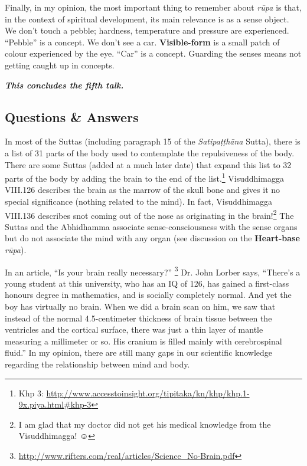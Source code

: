 Finally, in my opinion, the most important thing to remember about \textit{rūpa} is that, in the context of spiritual development, its main relevance is as a sense object. We don’t touch a pebble; hardness, temperature and pressure are experienced. “Pebble” is a concept. We don’t see a car. \textbf{Visible-form} is a small patch of colour experienced by the eye. “Car” is a concept. Guarding the senses means not getting caught up in concepts.

\begin{center}
\textbf{\textit{This concludes the fifth talk.}} \\
\end{center}

\newpage

\subsection*{Questions \& Answers}


In most of the Suttas (including paragraph 15 of the \textit{Satipaṭṭhāna} Sutta), there is a list of 31 parts of the body used to contemplate the repulsiveness of the body. There are some Suttas (added at a much later date) that expand this list to 32 parts of the body by adding the brain to the end of the list.\footnote{Khp 3: \url{http://www.accesstoinsight.org/tipitaka/kn/khp/khp.1-9x.piya.html\#khp-3}} Visuddhimagga VIII.126 describes the brain as the marrow of the skull bone and gives it no special significance (nothing related to the mind). In fact, Visuddhimagga VIII.136 describes snot coming out of the nose as originating in the brain!\footnote{I am glad that my doctor did not get his medical knowledge from the Visuddhimagga! ☺} The Suttas and the Abhidhamma associate sense-consciousness with the sense organs but do not associate the mind with any organ (see discussion on the \textbf{Heart-base} \textit{rūpa}).

In an article, “Is your brain really necessary?” \footnote{\url{http://www.rifters.com/real/articles/Science\_No-Brain.pdf}} Dr. John Lorber says, “There’s a young student at this university, who has an IQ of 126, has gained a first-class honours degree in mathematics, and is socially completely normal. And yet the boy has virtually no brain. When we did a brain scan on him, we saw that instead of the normal 4.5-centimeter thickness of brain tissue between the ventricles and the cortical surface, there was just a thin layer of mantle measuring a millimeter or so. His cranium is filled mainly with cerebrospinal fluid.” In my opinion, there are still many gaps in our scientific knowledge regarding the relationship between mind and body.

